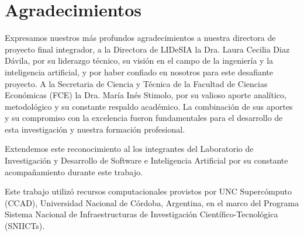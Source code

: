 \chapter*{Agradecimientos}

Expresamos nuestros más profundos agradecimientos a nuestra directora de proyecto final integrador, a la Directora de LIDeSIA la Dra. Laura Cecilia Diaz Dávila, por su liderazgo técnico, su visión en el campo de la ingeniería y la inteligencia artificial, y por haber confiado en nosotros para este desafiante proyecto. A la Secretaria de Ciencia y Técnica de la Facultad de Ciencias Económicas (FCE) la Dra. María Inés Stimolo, por su valioso aporte analítico, metodológico y su constante respaldo académico. La combinación de sus aportes y su compromiso con la excelencia fueron fundamentales para el desarrollo de esta investigación y nuestra formación profesional.

Extendemos este reconocimiento al los integrantes del Laboratorio de Investigación y Desarrollo de Software e Inteligencia Artificial por su constante acompañamiento durante este trabajo.

Este trabajo utilizó recursos computacionales provistos por UNC Supercómputo (CCAD), Universidad Nacional de Córdoba, Argentina, en el marco del Programa Sistema Nacional de Infraestructuras de Investigación Científico-Tecnológica (SNIICTs).
